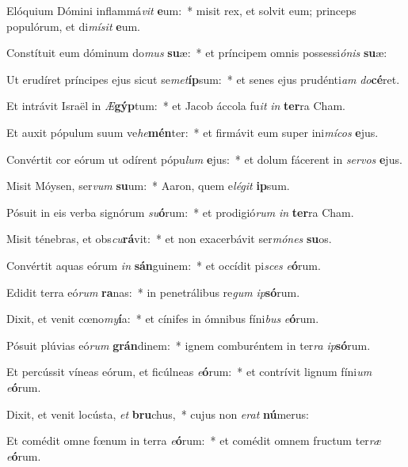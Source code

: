 \item Elóquium Dómini inflammá\textit{vit} \textbf{e}um:~* misit rex, et solvit eum; princeps populórum, et di\textit{mí}\textit{sit} \textbf{e}um.
\item Constítuit eum dóminum do\textit{mus} \textbf{su}æ:~* et príncipem omnis possessi\textit{ó}\textit{nis} \textbf{su}æ:
\item Ut erudíret príncipes ejus sicut se\textit{met}\textbf{íp}sum:~* et senes ejus prudénti\textit{am} \textit{do}\textbf{cé}ret.
\item Et intrávit Israël in \textit{Æ}\textbf{gýp}tum:~* et Jacob áccola fu\textit{it} \textit{in} \textbf{ter}ra Cham.
\item Et auxit pópulum suum ve\textit{he}\textbf{mén}ter:~* et firmávit eum super ini\textit{mí}\textit{cos} \textbf{e}jus.
\item Convértit cor eórum ut odírent pópu\textit{lum} \textbf{e}jus:~* et dolum fácerent in \textit{ser}\textit{vos} \textbf{e}jus.
\item Misit Móysen, ser\textit{vum} \textbf{su}um:~* Aaron, quem e\textit{lé}\textit{git} \textbf{ip}sum.
\item Pósuit in eis verba signórum \textit{su}\textbf{ó}rum:~* et prodigió\textit{rum} \textit{in} \textbf{ter}ra Cham.
\item Misit ténebras, et obs\textit{cu}\textbf{rá}vit:~* et non exacerbávit ser\textit{mó}\textit{nes} \textbf{su}os.
\item Convértit aquas eórum \textit{in} \textbf{sán}guinem:~* et occídit pi\textit{sces} \textit{e}\textbf{ó}rum.
\item Edidit terra eó\textit{rum} \textbf{ra}nas:~* in penetrálibus re\textit{gum} \textit{ip}\textbf{só}rum.
\item Dixit, et venit cœno\textit{my}\textbf{í}a:~* et cínifes in ómnibus fíni\textit{bus} \textit{e}\textbf{ó}rum.
\item Pósuit plúvias eó\textit{rum} \textbf{grán}dinem:~* ignem comburéntem in ter\textit{ra} \textit{ip}\textbf{só}rum.
\item Et percússit víneas eórum, et ficúlneas \textit{e}\textbf{ó}rum:~* et contrívit lignum fíni\textit{um} \textit{e}\textbf{ó}rum.
\item Dixit, et venit locústa, \textit{et} \textbf{bru}chus,~* cujus non \textit{e}\textit{rat} \textbf{nú}merus:
\item Et comédit omne fœnum in terra \textit{e}\textbf{ó}rum:~* et comédit omnem fructum ter\textit{ræ} \textit{e}\textbf{ó}rum.
